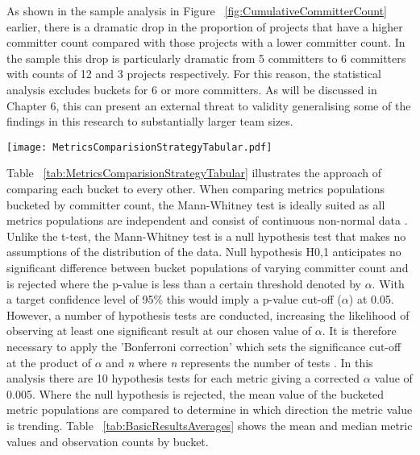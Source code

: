 As shown in the sample analysis in Figure ~\ref{fig:CumulativeCommitterCount} earlier, there is a dramatic drop in the proportion of projects that have a higher committer count compared with those projects with a lower committer count. In the sample this drop is particularly dramatic from 5 committers to 6 committers with counts of 12 and 3 projects respectively. For this reason, the statistical analysis excludes buckets for 6 or more committers. As will be discussed in Chapter 6, this can present an external threat to validity generalising some of the findings in this research to substantially larger team sizes. 

\begin{table}
\centering 
\caption{The bucketed metric comparison strategy.}
\begin{tabular}
 \centering 
 \texttt{[image: MetricsComparisionStrategyTabular.pdf]}
 \label{tab:MetricsComparisionStrategyTabular}
\end{tabular}
\end{table}

Table ~\ref{tab:MetricsComparisionStrategyTabular} illustrates the approach of comparing each bucket to every other. When comparing metrics populations bucketed by committer count, the Mann-Whitney test is ideally suited as all metrics populations are independent and consist of continuous non-normal data \citep{mann1947test}. Unlike the t-test, the Mann-Whitney test is a null hypothesis test that makes no assumptions of the distribution of the data. Null hypothesis H0,1 anticipates no significant difference between bucket populations of varying committer count and is rejected where the p-value is less than a certain threshold denoted by $\alpha$. With a target confidence level of 95\% this would imply a p-value cut-off ($\alpha$) at 0.05. However, a number of hypothesis tests are conducted, increasing the likelihood of observing at least one significant result at our chosen value of $\alpha$. It is therefore necessary to apply the 'Bonferroni correction' which sets the significance cut-off at the product of $\alpha$ and \textit{n} where \textit{n} represents the number of tests \citep{bonferroni1936teoria}. In this analysis there are 10 hypothesis tests for each metric giving a corrected $\alpha$ value of 0.005. Where the null hypothesis is rejected, the mean value of the bucketed metric populations are compared to determine in which direction the metric value is trending. Table ~\ref{tab:BasicResultsAverages} shows the mean and median metric values and observation counts by bucket.

